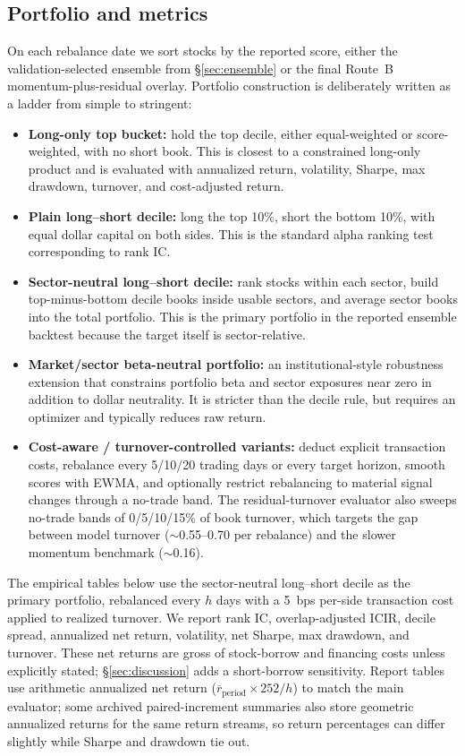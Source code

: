 \documentclass[9pt]{extarticle}
\begin{document}
\subsection{Portfolio and metrics}
On each rebalance date we sort stocks by the reported score, either the
validation-selected ensemble from \S\ref{sec:ensemble} or the final Route~B
momentum-plus-residual overlay. Portfolio construction is deliberately written
as a ladder from simple to stringent:
\begin{itemize}
  \item \textbf{Long-only top bucket:} hold the top decile, either equal-weighted
  or score-weighted, with no short book. This is closest to a constrained
  long-only product and is evaluated with annualized return, volatility, Sharpe,
  max drawdown, turnover, and cost-adjusted return.
  \item \textbf{Plain long--short decile:} long the top 10\%, short the bottom
  10\%, with equal dollar capital on both sides. This is the standard alpha
  ranking test corresponding to rank IC.
  \item \textbf{Sector-neutral long--short decile:} rank stocks within each
  sector, build top-minus-bottom decile books inside usable sectors, and average
  sector books into the total portfolio. This is the primary portfolio in the
  reported ensemble backtest because the target itself is sector-relative.
  \item \textbf{Market/sector beta-neutral portfolio:} an institutional-style
  robustness extension that constrains portfolio beta and sector exposures near
  zero in addition to dollar neutrality. It is stricter than the decile rule, but
  requires an optimizer and typically reduces raw return.
  \item \textbf{Cost-aware / turnover-controlled variants:} deduct explicit
  transaction costs, rebalance every 5/10/20 trading days or every target horizon,
  smooth scores with EWMA, and optionally restrict rebalancing to material
  signal changes through a no-trade band. The residual-turnover evaluator also
  sweeps no-trade bands of 0/5/10/15\% of book turnover, which targets the gap
  between model turnover ($\sim$0.55--0.70 per rebalance) and the slower
  momentum benchmark ($\sim$0.16).
\end{itemize}
The empirical tables below use the sector-neutral long--short decile as the
primary portfolio, rebalanced every $h$ days with a 5~bps per-side transaction
cost applied to realized turnover. We report rank IC, overlap-adjusted ICIR,
decile spread, annualized net return, volatility, net Sharpe, max drawdown, and
turnover. These net returns are gross of stock-borrow and financing costs unless
explicitly stated; \S\ref{sec:discussion} adds a short-borrow sensitivity.
Report tables use arithmetic annualized net return
($\overline r_{\mathrm{period}}\times252/h$) to match the main evaluator; some
archived paired-increment summaries also store geometric annualized returns for
the same return streams, so return percentages can differ slightly while Sharpe
and drawdown tie out.
\end{document}
